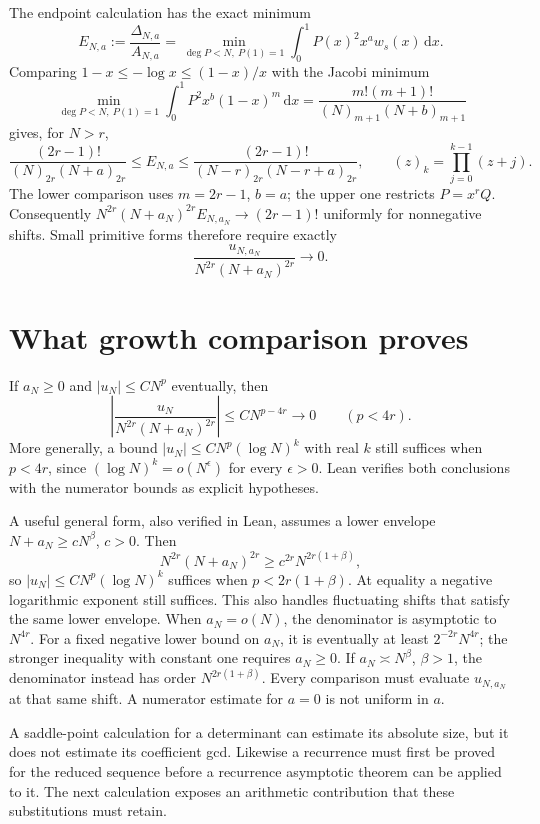\documentclass[11pt]{article}
\newcommand{\dd}{\,\mathrm{d}}
\begin{document}
The endpoint calculation has the exact minimum
\[
 E_{N,a}:=\frac{\Delta_{N,a}}{A_{N,a}}
 =\min_{\deg P<N,\ P(1)=1}\int_0^1P(x)^2x^aw_s(x)\dd x .
\]
Comparing $1-x\le-\log x\le(1-x)/x$ with the Jacobi minimum
\[
 \min_{\deg P<N,\ P(1)=1}\int_0^1P^2x^b(1-x)^m\dd x
 =\frac{m!(m+1)!}{(N)_{m+1}(N+b)_{m+1}}
\]
gives, for $N>r$,
\[
 \frac{(2r-1)!}{(N)_{2r}(N+a)_{2r}}
 \le E_{N,a}\le
 \frac{(2r-1)!}{(N-r)_{2r}(N-r+a)_{2r}},
 \qquad (z)_k=\prod_{j=0}^{k-1}(z+j).
\]
The lower comparison uses $m=2r-1$, $b=a$; the upper one restricts
$P=x^rQ$. Consequently
$N^{2r}(N+a_N)^{2r}E_{N,a_N}\to(2r-1)!$ uniformly for nonnegative shifts.
Small primitive forms therefore require exactly
\begin{equation}
 \frac{u_{N,a_N}}{N^{2r}(N+a_N)^{2r}}\longrightarrow0.
 \label{eq:target}
\end{equation}

\section{What growth comparison proves}
If $a_N\ge0$ and $|u_N|\le C N^p$ eventually, then
\[
 \left|\frac{u_N}{N^{2r}(N+a_N)^{2r}}\right|
 \le C N^{p-4r}\longrightarrow0\qquad(p<4r).
\]
More generally, a bound $|u_N|\le C N^p(\log N)^k$ with real $k$ still
suffices when $p<4r$, since $(\log N)^k=o(N^\epsilon)$ for every
$\epsilon>0$. Lean verifies both conclusions with the numerator bounds
as explicit hypotheses.

A useful general form, also verified in Lean, assumes a lower envelope
$N+a_N\ge cN^\beta$, $c>0$. Then
\[
 N^{2r}(N+a_N)^{2r}\ge c^{2r}N^{2r(1+\beta)},
\]
so $|u_N|\le CN^p(\log N)^k$ suffices when $p<2r(1+\beta)$.
At equality a negative logarithmic exponent still suffices. This also
handles fluctuating shifts that satisfy the same lower envelope.
When $a_N=o(N)$, the denominator is asymptotic to $N^{4r}$.
For a fixed negative lower bound on $a_N$, it is eventually at least
$2^{-2r}N^{4r}$; the stronger inequality with constant one requires
$a_N\ge0$. If $a_N\asymp N^\beta$, $\beta>1$, the denominator instead
has order $N^{2r(1+\beta)}$. Every comparison must evaluate $u_{N,a_N}$
at that same shift. A numerator estimate for $a=0$ is not uniform in $a$.

A saddle-point calculation for a determinant can estimate its absolute
size, but it does not estimate its coefficient gcd. Likewise a recurrence
must first be proved for the reduced sequence before a recurrence
asymptotic theorem can be applied to it. The next calculation exposes
an arithmetic contribution that these substitutions must retain.
\end{document}
